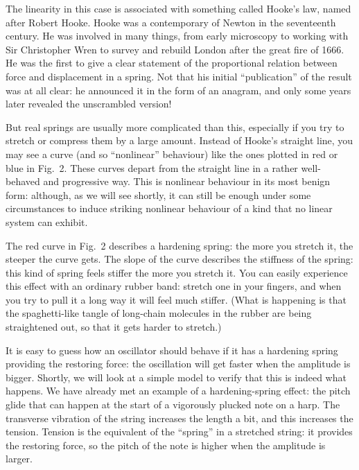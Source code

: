   The linearity in this case is associated with something called Hooke’s law, 
  named after Robert Hooke. Hooke was a contemporary of Newton in the 
  seventeenth century. He was involved in many things, from early microscopy to 
  working with Sir Christopher Wren to survey and rebuild London after the 
  great fire of 1666. He was the first to give a clear statement of the 
  proportional relation between force and displacement in a spring. Not that 
  his initial ``publication'' of the result was at all clear: he announced it 
  in the form of an anagram, and only some years later revealed the unscrambled 
  version! 

  But real springs are usually more complicated than this, especially if you 
  try to stretch or compress them by a large amount. Instead of Hooke’s 
  straight line, you may see a curve (and so “nonlinear” behaviour) like the 
  ones plotted in red or blue in Fig.\ 2. These curves depart from the straight 
  line in a rather well-behaved and progressive way. This is nonlinear 
  behaviour in its most benign form: although, as we will see shortly, it can 
  still be enough under some circumstances to induce striking nonlinear 
  behaviour of a kind that no linear system can exhibit. 

  The red curve in Fig.\ 2 describes a hardening spring: the more you stretch 
  it, the steeper the curve gets. The slope of the curve describes the 
  stiffness of the spring: this kind of spring feels stiffer the more you 
  stretch it. You can easily experience this effect with an ordinary rubber 
  band: stretch one in your fingers, and when you try to pull it a long way it 
  will feel much stiffer. (What is happening is that the spaghetti-like tangle 
  of long-chain molecules in the rubber are being straightened out, so that it 
  gets harder to stretch.) 

  It is easy to guess how an oscillator should behave if it has a hardening 
  spring providing the restoring force: the oscillation will get faster when 
  the amplitude is bigger. Shortly, we will look at a simple model to verify 
  that this is indeed what happens. We have already met an example of a 
  hardening-spring effect: the pitch glide that can happen at the start of a 
  vigorously plucked note on a harp. The transverse vibration of the string 
  increases the length a bit, and this increases the tension. Tension is the 
  equivalent of the ``spring'' in a stretched string: it provides the restoring 
  force, so the pitch of the note is higher when the amplitude is larger. 

